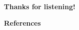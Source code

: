 \documentclass{beamer}
\begin{document}
\begin{frame}
    \begin{center}
        \LARGE\bf Thanks for listening!
    \end{center}
\end{frame}



\begin{frame}{\bf References}
    \nocite{*} %
    
    
\end{frame}
\end{document}
